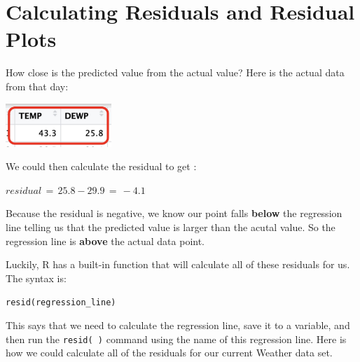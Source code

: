 \documentclass[
  letterpaper,
  DIV=11,
  numbers=noendperiod]{scrreprt}
\newenvironment{Shaded}{\begin{snugshade}}{\end{snugshade}}
\newcommand{\CommentTok}[1]{\textcolor[rgb]{0.37,0.37,0.37}{#1}}
\newcommand{\DecValTok}[1]{\textcolor[rgb]{0.68,0.00,0.00}{#1}}
\newcommand{\FunctionTok}[1]{\textcolor[rgb]{0.28,0.35,0.67}{#1}}
\newcommand{\NormalTok}[1]{\textcolor[rgb]{0.00,0.23,0.31}{#1}}
\newcommand{\OtherTok}[1]{\textcolor[rgb]{0.00,0.23,0.31}{#1}}
\newcommand{\SpecialCharTok}[1]{\textcolor[rgb]{0.37,0.37,0.37}{#1}}
\begin{document}
\section*{Calculating Residuals and Residual
Plots}\label{calculating-residuals-and-residual-plots}


How close is the predicted value from the actual value? Here is the
actual data from that day:

\includegraphics[width=0.3\textwidth,height=\textheight]{./images/ROP_8.jpg}

We could then calculate the residual to get :

\(residual \, = \, 25.8 - 29.9\, = \, -4.1\)

Because the residual is negative, we know our point falls \textbf{below}
the regression line telling us that the predicted value is larger than
the acutal value. So the regression line is \textbf{above} the actual
data point.

Luckily, R has a built-in function that will calculate all of these
residuals for us. The syntax is:

\texttt{resid(regression\_line)}

This says that we need to calculate the regression line, save it to a
variable, and then run the \texttt{resid(\ )} command using the name of
this regression line. Here is how we could calculate all of the
residuals for our current Weather data set.

\begin{Shaded}
\end{Shaded}
\end{document}
